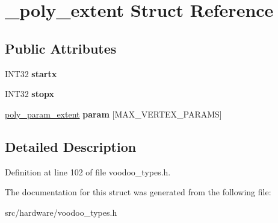 \hypertarget{struct__poly__extent}{\section{\-\_\-poly\-\_\-extent Struct Reference}
\label{struct__poly__extent}
}
\subsection*{Public Attributes}
\begin{DoxyCompactItemize}
\item 
\hypertarget{struct__poly__extent_aa2bb43196a899de281f15cee50fe834d}{I\-N\-T32 {\bfseries startx}}\label{struct__poly__extent_aa2bb43196a899de281f15cee50fe834d}

\item 
\hypertarget{struct__poly__extent_a7b9660b72517d1e35eea12c389dcafb0}{I\-N\-T32 {\bfseries stopx}}\label{struct__poly__extent_a7b9660b72517d1e35eea12c389dcafb0}

\item 
\hypertarget{struct__poly__extent_afc41f768d5582011a779bbec4a6f417d}{\hyperlink{struct__poly__param__extent}{poly\-\_\-param\-\_\-extent} {\bfseries param} \mbox{[}M\-A\-X\-\_\-\-V\-E\-R\-T\-E\-X\-\_\-\-P\-A\-R\-A\-M\-S\mbox{]}}\label{struct__poly__extent_afc41f768d5582011a779bbec4a6f417d}

\end{DoxyCompactItemize}


\subsection{Detailed Description}


Definition at line 102 of file voodoo\-\_\-types.\-h.



The documentation for this struct was generated from the following file\-:\begin{DoxyCompactItemize}
\item 
src/hardware/voodoo\-\_\-types.\-h\end{DoxyCompactItemize}
